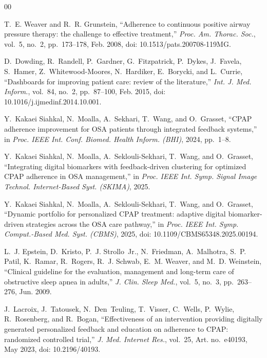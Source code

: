 \documentclass[conference]{IEEEtran}
\begin{document}
\begin{thebibliography}{00}

T.~E. Weaver and R.~R. Grunstein,
``Adherence to continuous positive airway pressure therapy: the
challenge to effective treatment,''
\textit{Proc. Am. Thorac. Soc.}, vol.~5, no.~2, pp.~173--178,
Feb. 2008, doi: 10.1513/pats.200708-119MG.

D.~Dowding, R.~Randell, P.~Gardner, G.~Fitzpatrick, P.~Dykes,
J.~Favela, S.~Hamer, Z.~Whitewood-Moores, N.~Hardiker, E.~Borycki,
and L.~Currie,
``Dashboards for improving patient care: review of the literature,''
\textit{Int. J. Med. Inform.}, vol.~84, no.~2, pp.~87--100,
Feb. 2015, doi: 10.1016/j.ijmedinf.2014.10.001.

Y.~Kakaei Siahkal, N.~Moalla, A.~Sekhari, T.~Wang, and O.~Grasset,
``CPAP adherence improvement for OSA patients through integrated
feedback systems,''
in \textit{Proc. IEEE Int. Conf. Biomed. Health Inform. (BHI)}, 2024,
pp.~1--8.

Y.~Kakaei Siahkal, N.~Moalla, A.~Seklouli-Sekhari, T.~Wang, and
O.~Grasset,
``Integrating digital biomarkers with feedback-driven clustering for
optimized CPAP adherence in OSA management,''
in \textit{Proc. IEEE Int. Symp. Signal Image Technol.
Internet-Based Syst. (SKIMA)}, 2025.

Y.~Kakaei Siahkal, N.~Moalla, A.~Seklouli-Sekhari, T.~Wang, and
O.~Grasset,
``Dynamic portfolio for personalized CPAP treatment: adaptive digital
biomarker-driven strategies across the OSA care pathway,''
in \textit{Proc. IEEE Int. Symp. Comput.-Based Med. Syst. (CBMS)},
2025, doi: 10.1109/CBMS65348.2025.00194.

L.~J. Epstein, D.~Kristo, P.~J. Strollo~Jr., N.~Friedman,
A.~Malhotra, S.~P. Patil, K.~Ramar, R.~Rogers, R.~J. Schwab,
E.~M. Weaver, and M.~D. Weinstein,
``Clinical guideline for the evaluation, management and long-term care
of obstructive sleep apnea in adults,''
\textit{J. Clin. Sleep Med.}, vol.~5, no.~3, pp.~263--276,
Jun. 2009.

J.~Lacroix, J.~Tatousek, N.~Den~Teuling, T.~Visser, C.~Wells,
P.~Wylie, R.~Rosenberg, and R.~Bogan,
``Effectiveness of an intervention providing digitally generated
personalized feedback and education on adherence to CPAP: randomized
controlled trial,''
\textit{J. Med. Internet Res.}, vol.~25, Art. no.~e40193, May 2023,
doi: 10.2196/40193.


\end{thebibliography}
\end{document}
